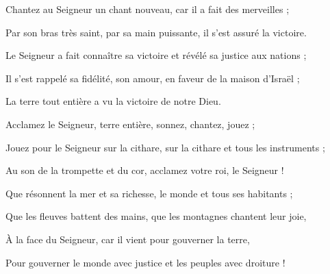 \item Chantez au Seigneur un chant nouveau, car il a fait des merveilles ; 
\item Par son bras très saint, par sa main puissante, il s'est assuré la victoire.
\item Le Seigneur a fait connaître sa victoire et révélé sa justice aux nations ;
\item Il s'est rappelé sa fidélité, son amour, en faveur de la maison d'Israël ; 
\item La terre tout entière a vu la victoire de notre Dieu.
\item Acclamez le Seigneur, terre entière, sonnez, chantez, jouez ;
\item Jouez pour le Seigneur sur la cithare, sur la cithare et tous les instruments ;
\item Au son de la trompette et du cor, acclamez votre roi, le Seigneur !
\item Que résonnent la mer et sa richesse, le monde et tous ses habitants ;
\item Que les fleuves battent des mains, que les montagnes chantent leur joie,
\item À la face du Seigneur, car il vient pour gouverner la terre,
\item Pour gouverner le monde avec justice et les peuples avec droiture !
